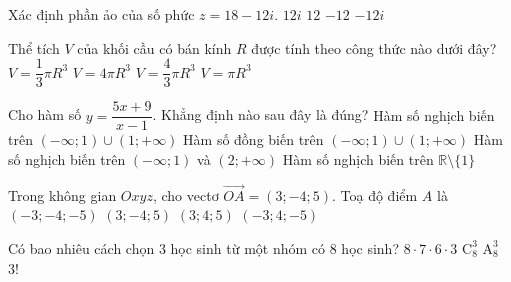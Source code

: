 \begin{ex}%
Xác định phần ảo của số phức   $z=18-12i$.
\choice
{ $12i$}
{ $12$}
{\True $-12$}
{$-12i$}
\end{ex}

\begin{ex}%
Thể tích $V$  của khối cầu có bán kính $R$  được tính theo công thức nào dưới đây?
\choice
{ $V=\dfrac{1}{3}\pi R^3$}
{ $V=4\pi R^3$}
{\True $V=\dfrac{4}{3}\pi R^3$}
{$V=\pi R^3$}
\end{ex}

\begin{ex}%
Cho hàm số  $y=\dfrac{5x+9}{x-1}$. Khẳng định nào sau đây là đúng?
\choice
{ Hàm số nghịch biến trên $(-\infty;1)\cup (1;+\infty)$}
{ Hàm số đồng biến trên $(-\infty;1)\cup (1;+\infty)$}
{\True Hàm số nghịch biến trên $(-\infty;1)$ và $(2;+\infty)$}
{Hàm số nghịch biến trên $\mathbb{R} \setminus \{1\}$}
\end{ex}

\begin{ex}%
Trong không gian  $Oxyz$, cho  vectơ  $\overrightarrow{OA}=(3;-4;5)$. Toạ độ điểm $A$ là
\choice
{ $(-3;-4;-5)$}
{\True $(3;-4;5)$}
{$(3;4;5)$}
{$(-3;4;-5)$}
\end{ex}

\begin{ex}%
Có bao nhiêu cách chọn $3$  học sinh từ một nhóm có  $8$  học sinh?
\choice
{ $8\cdot 7\cdot 6\cdot 3$}
{\True $\mathrm{C}_8^3$}
{$\mathrm{A}_8^3$}
{$3!$}
\end{ex}

